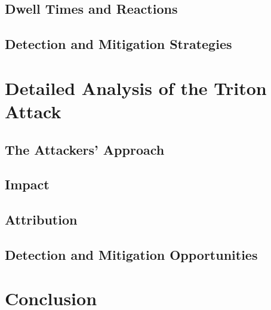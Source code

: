 \documentclass[runningheads]{llncs}
\begin{document}
\subsection{Dwell Times and Reactions}
\subsection{Detection and Mitigation Strategies}

\section{Detailed Analysis of the Triton Attack}
\subsection{The Attackers' Approach}
\subsection{Impact}
\subsection{Attribution}
\subsection{Detection and Mitigation Opportunities}
\section{Conclusion}

\newpage
%
%
%


\end{document}

